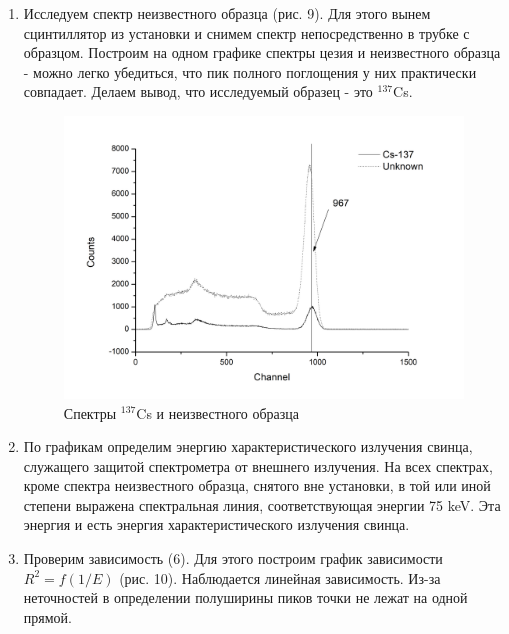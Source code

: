 \documentclass[a4paper]{article}
\begin{document}
\begin{enumerate}
\item Исследуем спектр неизвестного образца (рис. 9). Для этого вынем сцинтиллятор из установки и снимем спектр непосредственно в трубке с образцом. Построим на одном графике спектры цезия и неизвестного образца - можно легко убедиться, что пик полного поглощения у них практически совпадает. Делаем вывод, что исследуемый образец - это $^{137}$Cs.
\begin{figure}[h]
\begin{center}
\includegraphics[width=12cm]{Cs+unknown.png}
\caption{Спектры $^{137}$Cs и неизвестного образца}
\label{ris:experimoriginal} %
\end{center}
\end{figure}

\item По графикам определим энергию характеристического излучения свинца, служащего защитой спектрометра от внешнего излучения. На всех спектрах, кроме спектра неизвестного образца, снятого вне установки, в той или иной степени выражена спектральная линия, соответствующая энергии 75 keV. Эта энергия и есть энергия характеристического излучения свинца.


\item Проверим зависимость (6). Для этого построим график зависимости $R^2 = f(1/E)$ (рис. 10). Наблюдается линейная зависимость. Из-за неточностей в определении полуширины пиков точки не лежат на одной прямой. 


\end{enumerate}
\end{document}
